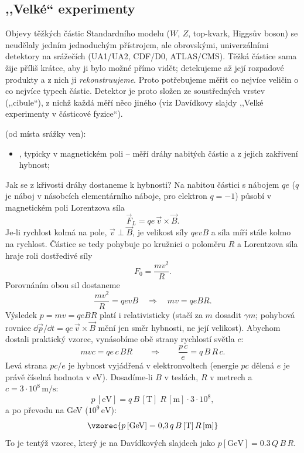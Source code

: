 \subsection{,,Velké`` experimenty}

Objevy těžkých částic Standardního modelu (\(W\), \(Z\), top-kvark, Higgsův boson) se
neudělaly jedním jednoduchým přístrojem, ale obrovskými, univerzálními detektory na
srážečích (UA1/UA2, CDF/D0, ATLAS/CMS). Těžká částice sama žije příliš krátce, aby ji bylo
možné přímo vidět; detekujeme až její rozpadové produkty a z nich ji \emph{rekonstruujeme}.
Proto potřebujeme měřit co nejvíce veličin o co nejvíce typech částic. Detektor je proto
složen ze soustředných vrstev (,,cibule``), z nichž každá měří něco jiného
(viz Davídkovy slajdy ,,Velké experimenty v částicové fyzice``).

 (od místa srážky ven):
\begin{itemize}[nosep]
  \item {}, typicky v magnetickém poli -- měří dráhy nabitých částic
        a z jejich zakřivení hybnost;
\end{itemize}

Jak se z křivosti dráhy dostaneme k hybnosti? Na nabitou částici s nábojem \(qe\)
(\(q\) je náboj v násobcích elementárního náboje, pro elektron \(q=-1\)) působí v magnetickém
poli Lorentzova síla
\[
  \vec F_L = qe\,\vec v\times\vec B .
\]
Je-li rychlost kolmá na pole, \(\vec v\perp\vec B\), je velikost síly \(qevB\) a síla míří stále
kolmo na rychlost. Částice se tedy pohybuje po kružnici o poloměru \(R\) a Lorentzova síla
hraje roli dostředivé síly
\[
  F_0 = \frac{mv^2}{R}.
\]
Porovnáním obou sil dostaneme
\[
  \frac{mv^2}{R} = qevB
  \quad\Longrightarrow\quad mv = qeBR .
\]
Výsledek \(p = mv = qeBR\) platí i relativisticky (stačí za \(m\) dosadit \(\gamma m\); pohybová
rovnice \(\dd\vec p/\dd t = qe\,\vec v\times\vec B\) mění jen směr hybnosti, ne její velikost).
Abychom dostali praktický vzorec, vynásobíme obě strany rychlostí světla \(c\):
\[
  mvc = qe\,c\,BR
  \qquad\Longrightarrow\qquad
  \frac{p\,c}{e} = q\,B\,R\,c .
\]
Levá strana \(pc/e\) je hybnost vyjádřená v elektronvoltech (energie \(pc\) dělená \(e\) je
právě číselná hodnota v eV). Dosadíme-li \(B\) v teslách, \(R\) v metrech a
\(c = 3\cdot10^{8}\,\mathrm{m/s}\):
\[
  p\,[\mathrm{eV}] = q\,B\,[\mathrm{T}]\;R\,[\mathrm{m}]\cdot 3\cdot10^{8},
\]
a po převodu na GeV (\(10^9\,\mathrm{eV}\)):
\[
  \vzorec{p\,[\mathrm{GeV}] = 0{,}3\,q\,B\,[\mathrm{T}]\,R\,[\mathrm{m}]}
\]
To je tentýž vzorec, který je na Davídkových slajdech jako \(p[\mathrm{GeV}]=0.3\,Q\,B\,R\).

